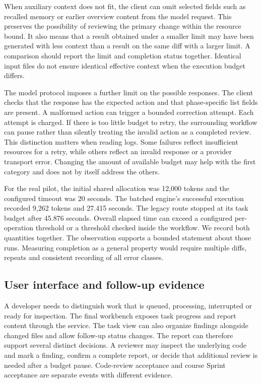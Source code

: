 \documentclass[journal,compsoc]{IEEEtran}
\begin{document}
When auxiliary context does not fit, the client can omit selected fields such as recalled memory or earlier overview content from the model request. This preserves the possibility of reviewing the primary change within the resource bound. It also means that a result obtained under a smaller limit may have been generated with less context than a result on the same diff with a larger limit. A comparison should report the limit and completion status together. Identical input files do not ensure identical effective context when the execution budget differs.

The model protocol imposes a further limit on the possible responses. The client checks that the response has the expected action and that phase-specific list fields are present. A malformed action can trigger a bounded correction attempt. Each attempt is charged. If there is too little budget to retry, the surrounding workflow can pause rather than silently treating the invalid action as a completed review. This distinction matters when reading logs. Some failures reflect insufficient resources for a retry, while others reflect an invalid response or a provider transport error. Changing the amount of available budget may help with the first category and does not by itself address the others.

For the real pilot, the initial shared allocation was 12,000 tokens and the configured timeout was 20 seconds. The batched engine's successful execution recorded 9,262 tokens and 27.415 seconds. The legacy route stopped at its task budget after 45.876 seconds. Overall elapsed time can exceed a configured per-operation threshold or a threshold checked inside the workflow. We record both quantities together. The observation supports a bounded statement about those runs. Measuring completion as a general property would require multiple diffs, repeats and consistent recording of all error classes.

\subsection{User interface and follow-up evidence}
A developer needs to distinguish work that is queued, processing, interrupted or ready for inspection. The final workbench exposes task progress and report content through the service. The task view can also organize findings alongside changed files and allow follow-up status changes. The report can therefore support several distinct decisions. A reviewer may inspect the underlying code and mark a finding, confirm a complete report, or decide that additional review is needed after a budget pause. Code-review acceptance and course Sprint acceptance are separate events with different evidence.
\end{document}
